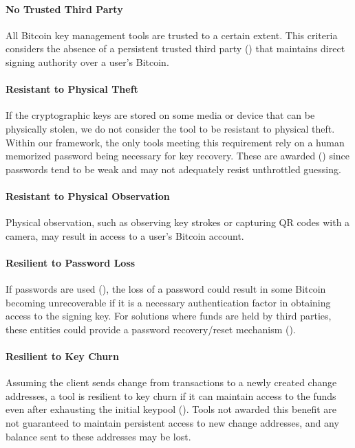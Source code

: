 \paragraph{No Trusted Third Party}
\label{No Trusted Third Party}
All Bitcoin key management tools are trusted to a certain extent. 
This criteria considers the absence of a persistent trusted third party (\full) that maintains direct signing authority over a user's Bitcoin. 

\paragraph{Resistant to Physical Theft}
\label{Resistant to Physical Theft}
If the cryptographic keys are stored on some media or device that can be physically stolen, we do not consider the tool to be resistant to physical theft. Within our framework, the only tools meeting this requirement rely on a human memorized password being necessary for key recovery. These are awarded (\prt) since passwords tend to be weak and may not adequately resist unthrottled guessing. 

\paragraph{Resistant to Physical Observation}
\label{Resistant to Physical Observation}
Physical observation, such as observing key strokes or capturing QR codes with a camera, may result in access to a user's Bitcoin account. 

\paragraph{Resilient to Password Loss}
\label{Resilient to Password Loss}
If passwords are used (\prt), the loss of a password could result in some Bitcoin becoming unrecoverable if it is a necessary authentication factor in obtaining access to the signing key. For solutions where funds are held by third parties, these entities could provide a password recovery/reset mechanism (\full).

\paragraph{Resilient to Key Churn}
\label{Compatible with Change Keys}
Assuming the client sends change from transactions to a newly created change addresses, a tool is resilient to key churn if it can maintain access to the funds even after exhausting the initial keypool (\full). Tools not awarded this benefit are not guaranteed to maintain persistent access to new change addresses, and any balance sent to these addresses may be lost.

